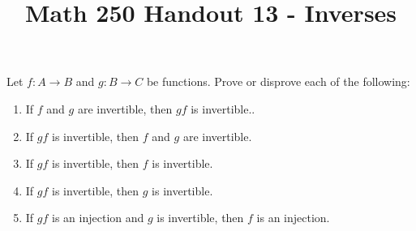 \documentclass[12pt, reqno]{amsart}
\begin{document}
\title[Math 250 Handout 13 - Inverses]{Math 250 Handout 13 - Inverses}\maketitle


 Let $f\colon A \to B$ and $g \colon B \to C$ be functions. Prove or
  disprove each of the following:
  \begin{enumerate}
  \item If $f$ and $g$ are invertible, then $gf$ is invertible..
  \item If $gf$ is invertible, then $f$ and $g$ are invertible.
  \item If $gf$ is invertible, then $f$ is invertible.
  \item If $gf$ is invertible, then $g$ is invertible.
  \item If $gf$ is an injection and $g$ is invertible, then $f$ is an
    injection.
  \end{enumerate}
\end{document}

